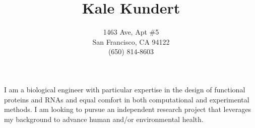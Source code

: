 \documentclass{article}
\title{Kale Kundert}
\author{1463 \nth{10} Ave, Apt \#5\\San Francisco, CA 94122\\(650) 814-8603}
\date{}
\begin{document}
 \maketitle

 \pagestyle{empty}
 \thispagestyle{empty}

 I am a biological engineer with particular expertise in the design of 
 functional proteins and RNAs and equal comfort in both computational and 
 experimental methods.  I am looking to pursue an independent research project 
 that leverages my background to advance human and/or environmental health.
 
 
 
 
 
 
 
 
 
 
 
\end{document}
